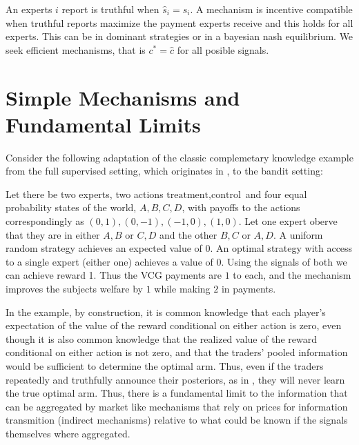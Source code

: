 An experts $i$ report is truthful when $\hat{s}_i=s_i$. A mechanism is incentive compatible when truthful reports maximize the payment experts receive and this holds for all experts. This can be in dominant strategies or in a bayesian nash equilibrium.  We seek efficient mechanisms, that is $c^{*} = \hat{c}$ for all posible signals.



\section{Simple Mechanisms and Fundamental Limits}

Consider the following adaptation of the classic complemetary knowledge example from the full supervised setting, which originates in \cite{geanakoplos1982we}, to the bandit setting:

\begin{eg}\label{eg:comp-ex}
	Let there be two experts, two actions ${\text{treatment},\text{control}}$ and four equal probability states of the world, ${A,B,C,D}$, with payoffs to the actions correspondingly as ${(0,1),(0,-1),(-1,0),(1,0)}$. Let one expert oberve that they are in either ${A,B}$ or ${C,D}$ and the other ${B,C}$ or ${A,D}$. A uniform random strategy achieves an expected value of 0. An optimal strategy with access to a single expert (either one) achieves a value of 0. Using the signals of both we can achieve reward 1. Thus the VCG payments are $1$ to each, and the mechanism improves the subjects welfare by $1$ while making $2$ in payments. 
\end{eg}

In the example, by construction, it is common knowledge that each player’s expectation of the value of the reward conditional on either action is zero, even though it is also common knowledge that the realized value of the reward conditional on either action is not zero, and that the traders’ pooled information would be sufficient to determine the optimal arm. Thus, even if the traders repeatedly and truthfully announce their posteriors, as in \cite{geanakoplos1982we}, they will never learn the true optimal arm. 
Thus, there is a fundamental limit to the information that can be aggregated by market like mechanisms that rely on prices for information transmition (indirect mechanisms) relative to what could be known if the signals themselves where aggregated. 


